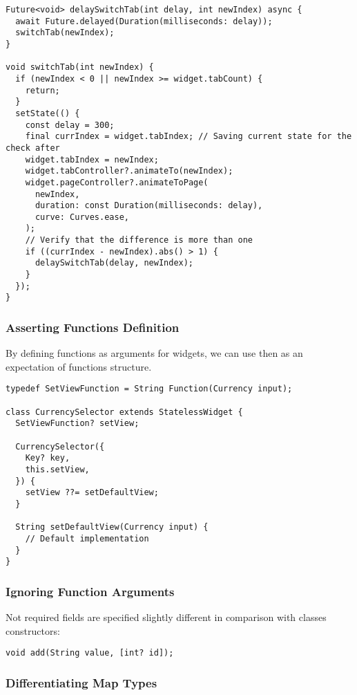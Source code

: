 \begin{lstlisting}
Future<void> delaySwitchTab(int delay, int newIndex) async {
  await Future.delayed(Duration(milliseconds: delay));
  switchTab(newIndex);
}

void switchTab(int newIndex) {
  if (newIndex < 0 || newIndex >= widget.tabCount) {
    return;
  }
  setState(() {
    const delay = 300;
    final currIndex = widget.tabIndex; // Saving current state for the check after 
    widget.tabIndex = newIndex;
    widget.tabController?.animateTo(newIndex);
    widget.pageController?.animateToPage(
      newIndex,
      duration: const Duration(milliseconds: delay),
      curve: Curves.ease,
    );
    // Verify that the difference is more than one
    if ((currIndex - newIndex).abs() > 1) {
      delaySwitchTab(delay, newIndex);
    }
  });
}
\end{lstlisting}


\subsubsection{Asserting Functions Definition}

By defining functions as arguments for widgets, we can use then as an expectation of functions structure.

\begin{lstlisting}
typedef SetViewFunction = String Function(Currency input);

class CurrencySelector extends StatelessWidget {
  SetViewFunction? setView;

  CurrencySelector({
    Key? key,
    this.setView,
  }) {
    setView ??= setDefaultView;
  }

  String setDefaultView(Currency input) {
    // Default implementation
  }
}
\end{lstlisting}


\subsubsection{Ignoring Function Arguments}

Not required fields are specified slightly different in comparison with classes constructors:

\begin{lstlisting}
void add(String value, [int? id]);
\end{lstlisting}


\subsubsection{Differentiating Map Types}

